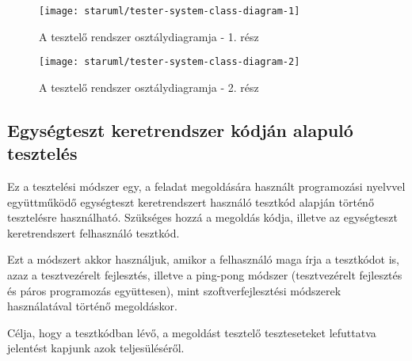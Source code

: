 \documentclass{elteikthesis}
\begin{document}
			\begin{figure}[H]
				\centering
				\texttt{[image: staruml/tester-system-class-diagram-1]}
				\caption{A tesztelő rendszer osztálydiagramja - 1. rész}
			\end{figure}
			
			\begin{figure}[H]
				\centering
				\texttt{[image: staruml/tester-system-class-diagram-2]}
				\caption{A tesztelő rendszer osztálydiagramja - 2. rész}
			\end{figure}
			
			\subsection{Egységteszt keretrendszer kódján alapuló tesztelés}
				Ez a tesztelési módszer egy, a feladat megoldására használt programozási nyelvvel együttműködő egységteszt keretrendszert használó tesztkód alapján történő tesztelésre használható. Szükséges hozzá a megoldás kódja, illetve az egységteszt keretrendszert felhasználó tesztkód.
				
				Ezt a módszert akkor használjuk, amikor a felhasználó maga írja a tesztkódot is, azaz a tesztvezérelt fejlesztés, illetve a ping-pong módszer (tesztvezérelt fejlesztés és páros programozás együttesen), mint szoftverfejlesztési módszerek használatával történő megoldáskor.
				
				Célja, hogy a tesztkódban lévő, a megoldást tesztelő teszteseteket lefuttatva jelentést kapjunk azok teljesüléséről.
\end{document}

